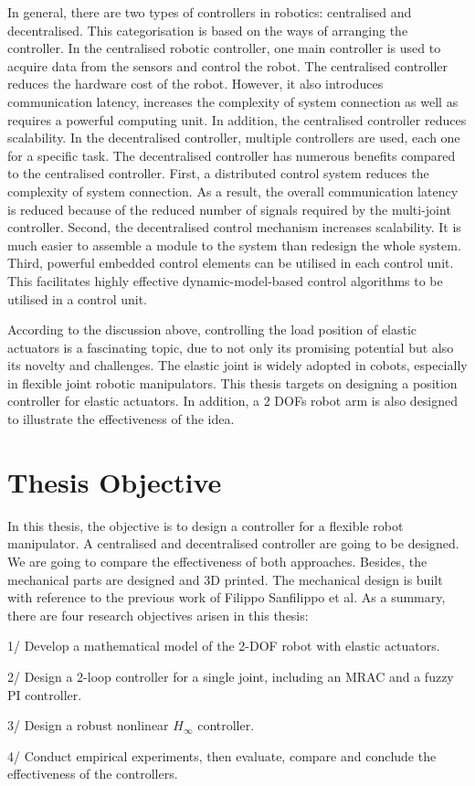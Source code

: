 \documentclass[./main.tex]{subfiles}
\begin{document}
In general, there are two types of controllers in robotics: centralised and decentralised. This categorisation is based on the ways of arranging the controller. In the centralised robotic controller, one main controller is used to acquire data from the sensors and control the robot. The centralised controller reduces the hardware cost of the robot. However, it also introduces communication latency, increases the complexity of system connection as well as requires a powerful computing unit. In addition, the centralised controller reduces scalability. In the decentralised controller, multiple controllers are used, each one for a specific task. The decentralised controller has numerous benefits compared to the centralised controller. First, a distributed control system reduces the complexity of system connection. As a result, the overall communication latency is reduced because of the reduced number of signals required by the multi-joint controller.  Second, the decentralised control mechanism increases scalability. It is much easier to assemble a module to the system than redesign the whole system. Third, powerful embedded control elements can be utilised in each control unit. This facilitates highly effective dynamic-model-based control algorithms to be utilised in a control unit.

According to the discussion above, controlling the load position of elastic actuators is a fascinating topic, due to not only its promising potential but also its novelty and challenges. The elastic joint is widely adopted in cobots, especially in flexible joint robotic manipulators. This thesis targets on designing a position controller for elastic actuators. In addition, a 2 DOFs robot arm is also designed to illustrate the effectiveness of the idea.

\section{Thesis Objective}
In this thesis, the objective is to design a controller for a flexible robot manipulator. A centralised and decentralised controller are going to be designed. We are going to compare the effectiveness of both approaches. Besides, the mechanical parts are designed and 3D printed. The mechanical design is built with reference to the previous work of Filippo Sanfilippo et al. As a summary, there are four research objectives arisen in this thesis:\par
1/ Develop a mathematical model of the 2-DOF robot with elastic actuators.\par
2/ Design a 2-loop controller for a single joint, including an MRAC and a fuzzy PI controller.\par
3/ Design a robust nonlinear $H_\infty$ controller.\par
4/ Conduct empirical experiments, then evaluate, compare and conclude the effectiveness of the controllers.
\end{document}
